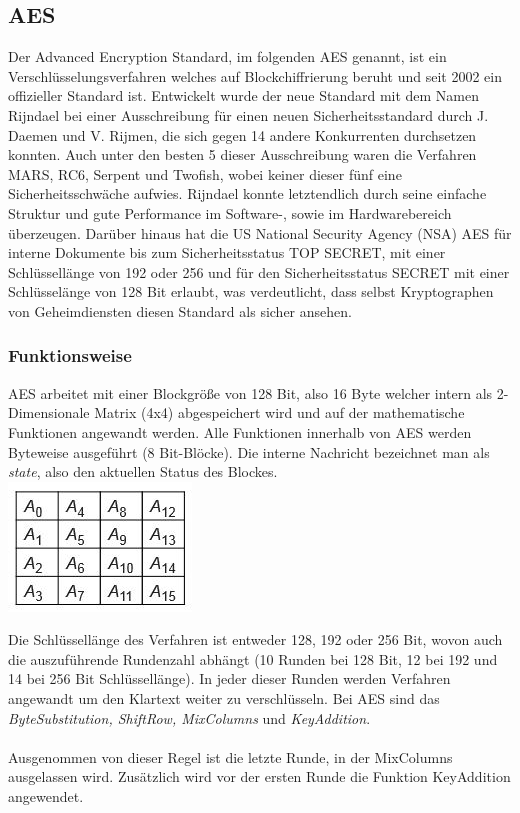 \documentclass[10pt, a4paper,headsepline]{scrreprt}
\begin{document}
\subsection{AES}
Der Advanced Encryption Standard, im folgenden AES genannt, ist ein Verschlüsselungsverfahren welches auf Blockchiffrierung beruht und seit 2002 ein offizieller Standard ist. Entwickelt wurde der neue Standard mit dem Namen Rijndael bei einer Ausschreibung für einen neuen Sicherheitsstandard durch J. Daemen und V. Rijmen, die sich gegen 14 andere Konkurrenten durchsetzen konnten. Auch unter den besten 5 dieser Ausschreibung waren die Verfahren MARS, RC6, Serpent und Twofish, wobei keiner dieser fünf eine Sicherheitsschwäche aufwies. Rijndael konnte letztendlich durch seine einfache Struktur und gute Performance im Software-, sowie im Hardwarebereich überzeugen. \citep[S. 343f]{book:it-sicherheit}
Darüber hinaus hat die US National Security Agency (NSA) AES für interne Dokumente bis zum Sicherheitsstatus TOP SECRET, mit einer Schlüssellänge von 192 oder 256 und für den Sicherheitsstatus SECRET mit einer Schlüsselänge von 128 Bit erlaubt, was verdeutlicht, dass selbst Kryptographen von Geheimdiensten diesen Standard als sicher ansehen. \citep[S. 89]{book:understanding-crypto}


\subsubsection{Funktionsweise}
AES arbeitet mit einer Blockgröße von 128 Bit, also 16 Byte welcher intern als 2-Dimensionale Matrix (4x4) abgespeichert wird und auf der mathematische Funktionen angewandt werden.
Alle Funktionen innerhalb von AES werden Byteweise ausgeführt (8 Bit-Blöcke).  Die interne Nachricht bezeichnet man als \textit{state}, also den aktuellen Status des Blockes. \\

\includegraphics[scale=0.5]{aes_state.JPG} 
\hfill

Die Schlüssellänge des Verfahren ist entweder 128, 192 oder 256 Bit, wovon auch die auszuführende Rundenzahl abhängt (10 Runden bei 128 Bit, 12 bei 192 und 14 bei 256 Bit Schlüssellänge). In jeder dieser Runden werden Verfahren angewandt um den Klartext weiter zu verschlüsseln. Bei AES sind das \textit{ByteSubstitution, ShiftRow, MixColumns} und \textit{KeyAddition}. \\ \\
Ausgenommen von dieser Regel ist die letzte Runde, in der MixColumns ausgelassen wird. %
Zusätzlich wird vor der ersten Runde die Funktion KeyAddition angewendet. \citep[S. 89ff]{book:understanding-crypto}
\end{document}

